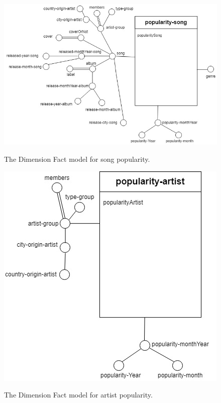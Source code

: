 \documentclass[12pt]{article}
\begin{document}
\begin{figure}[h]
    \centering
    \includegraphics[scale =0.5]{fct-popularity-song.jpg}\\[1 cm]
    \caption{The Dimension Fact model for song popularity.}
    \label{fig:factPopularitySong}
\end{figure}

\begin{figure}[h]
    \centering
    \includegraphics[scale =0.5]{fct-popularity-artist.jpg}\\[1 cm]
    \caption{The Dimension Fact model for artist popularity.}
    \label{fig:factPopularityArtist}
\end{figure}
\end{document}
